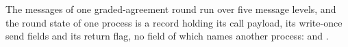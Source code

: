 \begin{definition}
  \label{def:aba-gbca-vocab}
  \leanok
  The messages of one graded-agreement round run over five message levels, and the round state of one process is a record holding its call payload, its write-once send fields and its return flag, no field of which names another process:  and .
\end{definition}
